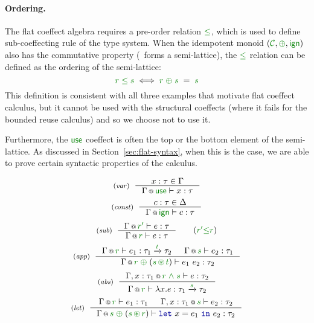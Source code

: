 \paragraph{Ordering.}

The flat coeffect algebra requires a pre-order relation $\cleq$, which is used to define 
sub-coeffecting rule of the type system. When the idempotent monoid $(\C, \cpar, \czero)$ also 
has the commutative property (\ie~forms a semi-lattice), the $\cleq$ relation can be defined as the
ordering of the semi-lattice:
%
\begin{equation*}
\cclrd{r} \;\cleq\; \cclrd{s} \;\Longleftrightarrow\; \cclrd{r} \;\cpar\; \cclrd{s} \;=\; \cclrd{s}
\end{equation*}
%
This definition is consistent with all three examples that motivate flat coeffect calculus, but
it cannot be used with the structural coeffects (where it fails for the bounded reuse 
calculus) and so we choose not to use it.

Furthermore, the $\cunit$ coeffect is often the top or the bottom element of the semi-lattice. 
As discussed in Section~\ref{sec:flat-syntax}, when this is the case, we are able to prove certain 
syntactic properties of the calculus.


\begin{figure}[t]
\begin{equation*}
\tyrule{var}
  {x : \tau \in \Gamma}
  {\coctx{\Gamma}{\cunit} \vdash x : \tau }
\end{equation*}
\begin{equation*}
\tyrule{const}
  {c : \tau \in \Delta}
  {\coctx{\Gamma}{\czero} \vdash c : \tau }
\end{equation*}
\begin{equation*}
\tyrule{sub}
  {\coctx{\Gamma}{\cclrd{r'}} \vdash e : \tau }
  {\coctx{\Gamma}{\cclrd{r}} \vdash e : \tau }\quad\quad(\cclrd{r'} \cleq \cclrd{r})
\end{equation*}
\begin{equation*}
\tyrule{app}
  {\coctx{\Gamma}{\cclrd{r}} \vdash e_1 : \tau_1 \xrightarrow{\cclrd{t}} \tau_2 &
   \coctx{\Gamma}{\cclrd{s}} \vdash e_2 : \tau_1 }
  {\coctx{\Gamma}{\cclrd{r} \;\cpar\; (\cclrd{s} \,\cseq\, \cclrd{t})} \vdash e_1~e_2 : \tau_2}
\end{equation*}
\begin{equation*}
\tyrule{abs}
  {\coctx{\Gamma, x:\tau_1}{\cclrd{r}\;\czip\;\cclrd{s}} \vdash e : \tau_2}
  {\coctx{\Gamma}{\cclrd{r}} \vdash \lambda x.e : \tau_1 \xrightarrow{\cclrd{s}} \tau_2 }
\end{equation*}
\begin{equation*}
\tyrule{let}
  { \coctx{\Gamma}{\cclrd{r}} \vdash e_1 : \tau_1 &
    \coctx{\Gamma, x:\tau_1}{\cclrd{s}} \vdash e_2 : \tau_2}
  {\coctx{\Gamma}{\cclrd{s} \;\cpar\; (\cclrd{s} \,\cseq\, \cclrd{r})} \vdash \kvd{let}~x=e_1~\kvd{in}~e_2 : \tau_2 }
\end{equation*}

\label{fig:flat-types}
\end{figure}

